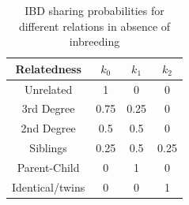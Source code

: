 \documentclass[12pt, letterpaper]{article}
\begin{document}
\begin{table}
\caption{\label{tab:Table 1}IBD sharing probabilities for different relations in absence of inbreeding}
\begin{tabular}{|c|c|c|c|}
    \hline
    Relatedness & $k_0$ & $k_1$ & $k_2$\\
    \hline
    Unrelated & 1 & 0 & 0\\
    \hline
    3rd Degree & 0.75 & 0.25 & 0\\
    \hline
    2nd Degree & 0.5 & 0.5 & 0\\
    \hline
    Siblings & 0.25 & 0.5 & 0.25\\
    \hline
    Parent-Child & 0 & 1 & 0\\
    \hline
    Identical/twins & 0 & 0 & 1\\
    \hline
\end{tabular}
\label{table1}
\end{table}
\end{document}
